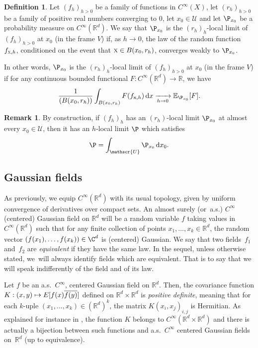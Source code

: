 \documentclass[10pt]{amsart}
\let\mathcal\mathscr
\newcommand{\NoChangel}[1]{%
\expandafter\let\csname old\string#1\endcsname=#1
\let#1=\relax
\newcommand{#1}{\mathcode`l="716C\csname old\string#1\endcsname\mathcode`l="7160 }%
}
\newcommand\mto{\mathchoice{\longmapsto}{\mapsto}{\mapsto}{\mapsto}}
\newcommand{\rd}{\,\mathrm{d}}
\theoremstyle{plain}
\theoremstyle{definition}
\newtheorem{definition}[theorem]{Definition}
\newtheorem{remark}[theorem]{Remark}
\newcommand{\R}{\mathbb{R}}
\def\calU{\mathcal{U}}
\DeclareMathOperator{\Vol}{Vol}\NoChangel{\Vol}
\begin{document}
\begin{definition}
Let $(f_h)_{h>0}$ be a family of functions in $C^\infty(X)$, let $(r_h)_{h>0}$ be a family of positive real numbers converging to $0$, let $x_0\in\calU$ and let $\P_{x_0}$ be a probability measure on $C^\infty(\R^d)$. We say that $\P_{x_0}$ is the $(r_h)_h$-local limit of $(f_h)_{h>0}$ at $x_0$ (in the frame $V$) if, as $h\to 0$, the law of the random function $f_{\textsc{x},h}$, conditioned on the event that $\textsc{x}\in B(x_0,r_h)$, converges weakly to $\P_{x_0}$.
\end{definition}

In other words, $\P_{x_0}$ is the $(r_h)_h$-local limit of $(f_h)_{h>0}$ at $x_0$ (in the frame $V$) if for any continuous bounded functional $F: C^\infty(\R^d) \to \R$, we have
\[
\frac{1}{\Vol(B(x_0, r_h))} \int_{B(x_0,r_h)} F (f_{\mathrm{x},h})\rd x \xrightarrow[h \to 0]{} \mathbb{E}_{\P_{x_0}} [F].
\]

\begin{remark}\label{rem:PointwiseToGlobal}
By construction, if $(f_h)_h$ has an $(r_h)$-local limit $\P_{x_0}$ at almost every $x_0\in\calU$, then it has an $h$-local limit $\P$ which satisfies
\[
\P = \int_{\calU} \P_{x_0} \rd x_0.
\]
\end{remark}

\subsection{Gaussian fields}\label{subsec:GaussField}

As previously, we equip $C^\infty(\R^d)$ with its usual topology, given by uniform convergence of derivatives over compact sets. An almost surely (or~a.s.) $C^\infty$ (centered) Gaussian field on $\R^d$ will be a random variable $f$ taking values in $C^\infty(\R^d)$ such that for any finite collection of points $x_1,\dots,x_k\in \R^d$, the random vector $(f(x_1),\dots,f(x_k))\in \C^d$ is (centered) Gaussian. We say that two fields~$f_1$ and~$f_2$ are \emph{equivalent} if they have the same law. In the sequel, unless otherwise stated, we~will always identify fields which are equivalent. That is to say that we will speak indifferently of the field and of its law.

Let $f$ be an a.s.\ $C^\infty$, centered Gaussian field on $\R^d$. Then, the covariance function $K:(x,y)\mto E[f(x)\overline{f(y)}]$ defined on $\R^d\times \R^d$ is \emph{positive definite}, meaning that for each $k$-uple $(x_1,\dots,x_k)\in (\R^d)^k$, the matrix $K(x_i,x_j)_{i,j}$ is Hermitian. As explained for instance in \cite[App.\,A.11]{NS}, the function $K$ belongs to $C^\infty(\R^d\times \R^d)$ and there is actually a bijection between such functions and a.s.\ $C^\infty$ centered Gaussian fields on~$\R^d$ (up to equivalence).
\end{document}
